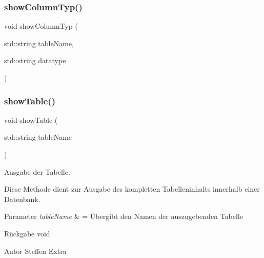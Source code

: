\subsubsection{show\+Column\+Typ()}
{\footnotesize\ttfamily void show\+Column\+Typ (\begin{DoxyParamCaption}\item[{std\+::string}]{table\+Name,  }\item[{std\+::string}]{datatype }\end{DoxyParamCaption})}

\mbox{\label{tables_8hpp_a22fbeb7f18a00bafd4864de51a3bca28}} 
\subsubsection{show\+Table()}
{\footnotesize\ttfamily void show\+Table (\begin{DoxyParamCaption}\item[{std\+::string}]{table\+Name }\end{DoxyParamCaption})}



Ausgabe der Tabelle. 

Diese Methode dient zur Ausgabe des kompletten Tabelleninhalts innerhalb einer Datenbank.


\begin{DoxyParams}{Parameter}
{\em table\+Name} & = Übergibt den Namen der auszugebenden Tabelle\\
\hline
\end{DoxyParams}
\begin{DoxyReturn}{Rückgabe}
void
\end{DoxyReturn}
\begin{DoxyAuthor}{Autor}
Steffen Extra 
\end{DoxyAuthor}

